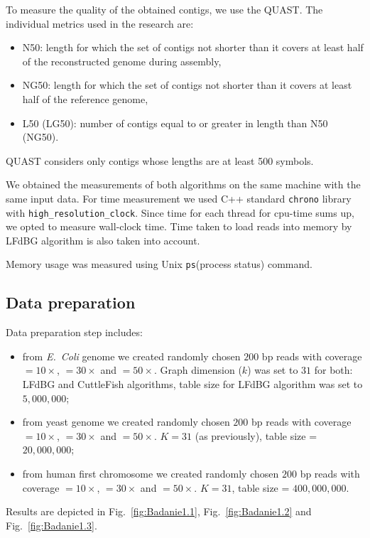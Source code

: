 \documentclass[12pt]{article}
\begin{document}
To measure the quality of the obtained contigs, we use the QUAST\cite{gurevich2013quast}. The individual metrics used in the research are:
\begin{itemize}
\item N50: length for which the set of contigs not shorter than it covers at least half of the reconstructed genome during assembly,
\item NG50: length for which the set of contigs not shorter than it covers at least half of the reference genome,
\item L50 (LG50): number of contigs equal to or greater in length than N50 (NG50).
\end{itemize}
QUAST considers only contigs whose lengths are at least 500 symbols.

We obtained the measurements of both algorithms on the same machine with the same input data.
For time measurement we used C++ standard \texttt{chrono} library\cite{josuttis2012c++} with \texttt{high\_resolution\_clock}. Since time for each thread for cpu-time sums up, we opted to measure wall-clock time. Time taken to load reads into memory by LFdBG algorithm is also taken into account.

Memory usage was measured using Unix \texttt{ps}(process status) command\cite{raymond2003art}.

\subsection{Data preparation}

Data preparation step includes:
\begin{itemize}
\item from \textit{E.~Coli} genome we created randomly chosen $200$ bp reads with coverage $=10\times$, $=30\times$ and $=50\times$.
Graph dimension ($k$) was set to $31$ for both: LFdBG and CuttleFish algorithms, table size for LFdBG algorithm was set to $5,000,000$;
\item from yeast genome we created randomly chosen $200$ bp reads with coverage $=10\times$, $=30\times$ and $=50\times$.
  $K = 31$ (as previously), table size = $20,000,000$;
\item from human first chromosome we created randomly chosen $200$ bp reads with coverage $=10\times$, $=30\times$ and $=50\times$.
  $K = 31$, table size = $400,000,000$.
\end{itemize}

Results are depicted in Fig.~\ref{fig:Badanie1.1},  Fig.~\ref{fig:Badanie1.2} and  Fig.~\ref{fig:Badanie1.3}.
\end{document}
